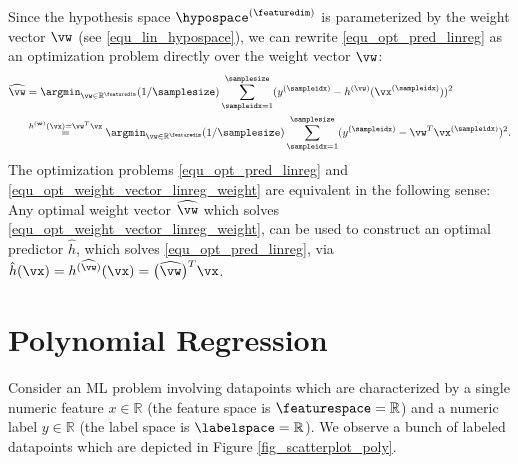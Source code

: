 \documentclass[12pt]{report}
\begin{document}
Since the hypothesis space $\hypospace^{(\featuredim)} $ is 
parameterized by the weight vector $\vw$ (see \eqref{equ_lin_hypospace}), 
we can rewrite \eqref{equ_opt_pred_linreg} as an optimization 
problem directly over the weight vector $\vw$: 
\begin{align} 
\label{equ_opt_weight_vector_linreg_weight}
\widehat{\vw} &  = \argmin_{\vw \in \mathbb{R}^{\featuredim}} (1/\samplesize) \sum_{\sampleidx=1}^{\samplesize} (y^{(\sampleidx)} - h^{(\vw)}(\vx^{(\sampleidx)}))^{2} \nonumber \\
& \stackrel{h^{(\mathbf{w})}(\vx) = \vw^{T} \vx}{=} \argmin_{\vw \in \mathbb{R}^{\featuredim}} (1/\samplesize) \sum_{\sampleidx=1}^{\samplesize} (y^{(\sampleidx)} - \vw^{T} \vx^{(\sampleidx)})^{2}.
\end{align} 
The optimization problems \eqref{equ_opt_pred_linreg} and \eqref{equ_opt_weight_vector_linreg_weight} 
are equivalent in the following sense: Any optimal weight vector $\widehat{\vw}$ which solves 
\eqref{equ_opt_weight_vector_linreg_weight}, can be used to 
construct an optimal predictor $\hat{h}$, which solves 
\eqref{equ_opt_pred_linreg}, via $\hat{h}(\vx) = h^{(\widehat{\vw})}(\vx) = \big(\widehat{\vw}\big)^{T} \vx$. 


\section{Polynomial Regression} 
\label{sec_polynomial_regression}


Consider an ML problem involving datapoints which are characterized by a 
single numeric feature $x \in  \mathbb{R}$ (the feature space is $\featurespace= \mathbb{R}$) 
and a numeric label $y \in \mathbb{R}$ (the label space is $\labelspace= \mathbb{R}$). 
We observe a bunch of labeled datapoints which are depicted in Figure \ref{fig_scatterplot_poly}. 
\end{document}
